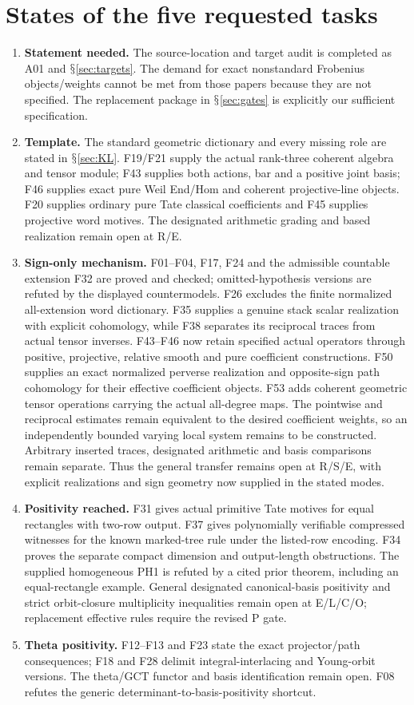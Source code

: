 \documentclass[11pt,a4paper]{article}
\renewcommand{\S}{\ensuremath{\mathsection}}
\theoremstyle{named}\newtheorem{finding}{Finding}[section]
\theoremstyle{definition}\newtheorem{definition}[finding]{Definition}
\theoremstyle{remark}\newtheorem{remark}[finding]{Remark}
\begin{document}
\section{States of the five requested tasks}
\begin{enumerate}
\item \textbf{Statement needed.} The source-location and target audit is completed as A01 and \S\ref{sec:targets}. The demand for exact nonstandard Frobenius objects/weights cannot be met from those papers because they are not specified. The replacement package in \S\ref{sec:gates} is explicitly our sufficient specification.
\item \textbf{Template.} The standard geometric dictionary and every missing role are stated in \S\ref{sec:KL}. F19/F21 supply the actual rank-three coherent algebra and tensor module; F43 supplies both actions, bar and a positive joint basis; F46 supplies exact pure Weil End/Hom and coherent projective-line objects. F20 supplies ordinary pure Tate classical coefficients and F45 supplies projective word motives. The designated arithmetic grading and based realization remain open at R/E.
\item \textbf{Sign-only mechanism.} F01--F04, F17, F24 and the admissible countable extension F32 are proved and checked; omitted-hypothesis versions are refuted by the displayed countermodels. F26 excludes the finite normalized all-extension word dictionary. F35 supplies a genuine stack scalar realization with explicit cohomology, while F38 separates its reciprocal traces from actual tensor inverses. F43--F46 now retain specified actual operators through positive, projective, relative smooth and pure coefficient constructions. F50 supplies an exact normalized perverse realization and opposite-sign path cohomology for their effective coefficient objects. F53 adds coherent geometric tensor operations carrying the actual all-degree maps. The pointwise and reciprocal estimates remain equivalent to the desired coefficient weights, so an independently bounded varying local system remains to be constructed. Arbitrary inserted traces, designated arithmetic and basis comparisons remain separate. Thus the general transfer remains open at R/S/E, with explicit realizations and sign geometry now supplied in the stated modes.
\item \textbf{Positivity reached.} F31 gives actual primitive Tate motives for equal rectangles with two-row output. F37 gives polynomially verifiable compressed witnesses for the known marked-tree rule under the listed-row encoding. F34 proves the separate compact dimension and output-length obstructions. The supplied homogeneous PH1 is refuted by a cited prior theorem, including an equal-rectangle example. General designated canonical-basis positivity and strict orbit-closure multiplicity inequalities remain open at E/L/C/O; replacement effective rules require the revised P gate.
\item \textbf{Theta positivity.} F12--F13 and F23 state the exact projector/path consequences; F18 and F28 delimit integral-interlacing and Young-orbit versions. The theta/GCT functor and basis identification remain open. F08 refutes the generic determinant-to-basis-positivity shortcut.
\end{enumerate}
\end{document}
